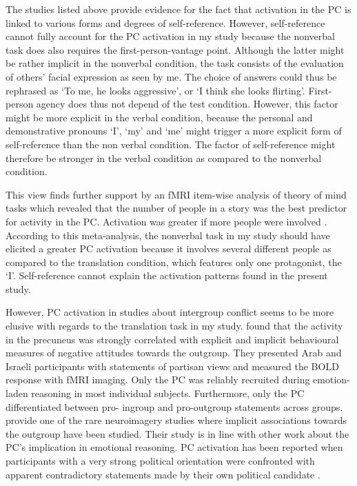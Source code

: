 \documentclass[output=paper]{LSP/langsci}
\begin{document}
The studies listed above provide evidence for the fact that activation in the PC is linked to various forms and degrees of self-reference. However, self-reference cannot fully account for the PC activation in my study because the nonverbal task does also requires the first-person-vantage point. Although the latter might be rather implicit in the nonverbal condition, the task consists of the evaluation of others' facial expression as seen by me. The choice of answers could thus be rephrased as `To me, he looks aggressive', or `I think she looks flirting'. First-person agency does thus not depend of the test condition. However, this factor might be more explicit in the verbal condition, because the personal and demonstrative pronouns `I', `my' and `me' might trigger a more explicit form of self-reference than the non verbal condition. The factor of self-reference might therefore be stronger in the verbal condition as compared to the nonverbal condition.

This view finds further support by an fMRI item-wise analysis of theory of mind tasks which revealed that the number of people in a story was the best predictor for activity in the PC. Activation was greater if more people were involved \citep{DodellFeder2011}. According to this meta-analysis, the nonverbal task in my study should have elicited a greater PC activation because it involves several different people as compared to the translation condition, which features only one protagonist, the `I'. Self-reference cannot explain the activation patterns found in the present study.

However, PC activation in studies about intergroup conflict seems to be more elusive with regards to the translation task in my study. \citet{Bruneau2010} found that the activity in the precuneus was strongly correlated with explicit and implicit behavioural measures of negative attitudes towards the outgroup. They presented Arab and Israeli participants with statements of partisan views and measured the BOLD response with fMRI imaging. Only the PC was reliably recruited during emotion- laden reasoning in most individual subjects. Furthermore, only the PC differentiated between pro- ingroup and pro-outgroup statements across groups. \citet{Bruneau2010} provide one of the rare neuroimagery studies where implicit associations towards the outgroup have been studied. Their study is in line with other work about the PC's implication in emotional reasoning. PC activation has been reported when participants with a very strong political orientation were confronted with apparent contradictory statements made by their own political candidate \citet{Bruneau2010}.
\end{document}
